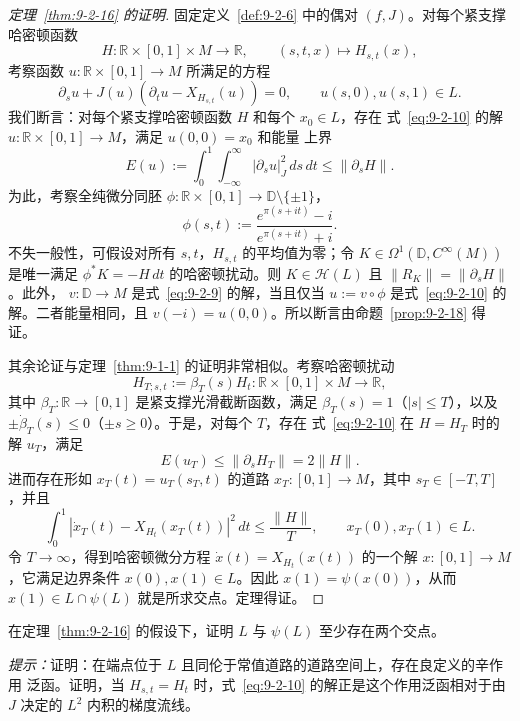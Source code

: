 \begin{proof}[定理~\ref{thm:9-2-16} 的证明]
固定定义~\ref{def:9-2-6} 中的偶对 $(f,J)$。对每个紧支撑哈密顿函数
\[
  H:\mathbb R\times[0,1]\times M\longrightarrow\mathbb R,
  \qquad(s,t,x)\longmapsto H_{s,t}(x),
\]
考察函数 $u:\mathbb R\times[0,1]\to M$ 所满足的方程
\begin{equation}\label{eq:9-2-10}
  \partial_su+J(u)(\partial_tu-X_{H_{s,t}}(u))=0,
  \qquad u(s,0),u(s,1)\in L.
\end{equation}
我们断言：对每个紧支撑哈密顿函数 $H$ 和每个 $x_0\in L$，存在
式~\eqref{eq:9-2-10} 的解 $u:\mathbb R\times[0,1]\to M$，满足 $u(0,0)=x_0$ 和能量
上界
\[
  E(u):=\int_0^1\int_{-\infty}^{\infty}|\partial_su|_J^2\,ds\,dt
  \le\|\partial_sH\|.
\]
为此，考察全纯微分同胚
$\phi:\mathbb R\times[0,1]\to\mathbb D\setminus\{\pm1\}$，
\begin{equation}\label{eq:9-2-11}
  \phi(s,t):=\frac{e^{\pi(s+it)}-i}{e^{\pi(s+it)}+i}.
\end{equation}
不失一般性，可假设对所有 $s,t$，$H_{s,t}$ 的平均值为零；令
$K\in\Omega^1(\mathbb D,C^\infty(M))$ 是唯一满足
$\phi^*K=-H\,dt$ 的哈密顿扰动。则
$K\in\mathcal H(L)$ 且 $\|R_K\|=\|\partial_sH\|$。此外，
$v:\mathbb D\to M$ 是式~\eqref{eq:9-2-9} 的解，当且仅当
$u:=v\circ\phi$ 是式~\eqref{eq:9-2-10} 的解。二者能量相同，且
$v(-i)=u(0,0)$。所以断言由命题~\ref{prop:9-2-18} 得证。

其余论证与定理~\ref{thm:9-1-1} 的证明非常相似。考察哈密顿扰动
\[
  H_{T;s,t}:=\beta_T(s)H_t:
  \mathbb R\times[0,1]\times M\longrightarrow\mathbb R,
\]
其中 $\beta_T:\mathbb R\to[0,1]$ 是紧支撑光滑截断函数，满足
$\beta_T(s)=1$（$|s|\le T$），以及
$\pm\dot\beta_T(s)\le0$（$\pm s\ge0$）。于是，对每个 $T$，存在
式~\eqref{eq:9-2-10} 在 $H=H_T$ 时的解 $u_T$，满足
\[
  E(u_T)\le\|\partial_sH_T\|=2\|H\|.
\]
进而存在形如 $x_T(t)=u_T(s_T,t)$ 的道路 $x_T:[0,1]\to M$，其中
$s_T\in[-T,T]$，并且
\[
  \int_0^1|\dot x_T(t)-X_{H_t}(x_T(t))|^2\,dt
  \le\frac{\|H\|}{T},
  \qquad x_T(0),x_T(1)\in L.
\]
令 $T\to\infty$，得到哈密顿微分方程
$\dot x(t)=X_{H_t}(x(t))$ 的一个解 $x:[0,1]\to M$，它满足边界条件
$x(0),x(1)\in L$。因此 $x(1)=\psi(x(0))$，从而
$x(1)\in L\cap\psi(L)$ 就是所求交点。定理得证。
\end{proof}

\begin{exercise}\label{ex:9-2-19}
在定理~\ref{thm:9-2-16} 的假设下，证明 $L$ 与 $\psi(L)$ 至少存在两个交点。

\emph{提示：}证明：在端点位于 $L$ 且同伦于常值道路的道路空间上，存在良定义的辛作用
泛函。证明，当 $H_{s,t}=H_t$ 时，式~\eqref{eq:9-2-10} 的解正是这个作用泛函相对于由
$J$ 决定的 $L^2$ 内积的梯度流线。
\end{exercise}
